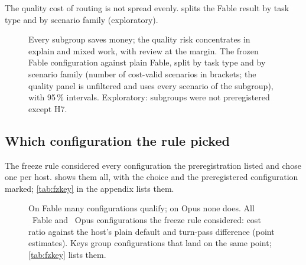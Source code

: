 The quality cost of routing is not spread evenly.  splits the Fable result by task type and by scenario family (exploratory).

\begin{figure}[htbp]
\centering
{}\par\smallskip

\caption{Every subgroup saves money; the quality risk concentrates in explain and mixed work, with review at the margin. The frozen Fable configuration against plain Fable, split by task type and by scenario family (number of
cost-valid scenarios in brackets; the quality panel is unfiltered and uses every scenario of the subgroup), with 95\,\%
intervals. Exploratory: subgroups were not preregistered except H7.}
\label{fig:subgroups}
\end{figure}

\subsection{Which configuration the rule picked}

The freeze rule considered every configuration the preregistration listed and chose one per host.  shows them all, with the choice and the preregistered configuration marked; \cref{tab:fzkey} in the appendix lists them.

\begin{figure}[htbp]
\centering
{}\par\smallskip
{}\par\medskip
{}
\caption{On Fable many configurations qualify; on Opus none does. All \FzFableN\ Fable and \FzOpusN\ Opus configurations the freeze rule considered: cost ratio against the
host's plain default and turn-pass difference (point estimates). Keys group configurations that land on the same
point; \cref{tab:fzkey} lists them.}
\label{fig:fz}
\end{figure}

